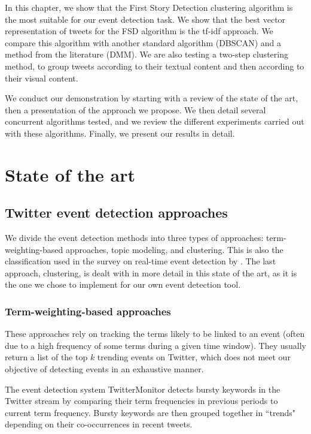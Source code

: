  In this chapter, we show that the First Story Detection clustering algorithm is the most suitable for our event detection task. We show that the best vector representation of tweets for the FSD algorithm is the tf-idf approach. We compare this algorithm with another standard algorithm (DBSCAN) and a method from the literature (DMM). We are also testing a two-step clustering method, to group tweets according to their textual content and then according to their visual content.
 
We conduct our demonstration by starting with a review of the state of the art, then a presentation of the  approach we propose. We then detail several concurrent algorithms tested, and we review the different experiments carried out with these algorithms. Finally, we present our results in detail.


\section{State of the art}

		
		\subsection{Twitter event detection approaches}
		We divide the event detection methods into three types of approaches: term-weighting-based approaches, topic modeling, and clustering. This is also the classification used in the survey on real-time event detection by \citet{hasan_survey_2018}. The last approach, clustering, is dealt with in more detail in this state of the art, as it is the one we chose to implement for our own event detection tool.
		
		\subsubsection{Term-weighting-based approaches}
		These approaches rely on tracking the terms likely to be linked to an event (often due to a high frequency of some terms during a given time window). They usually return a list of the top $k$ trending events on Twitter, which does not meet our objective of detecting events in an exhaustive manner.
		
		The event detection system TwitterMonitor \citep{mathioudakis_twittermonitor:_2010} detects bursty keywords in the Twitter stream by comparing their term frequencies in previous periods to current term frequency. Bursty keywords are then grouped together in ``trends" depending on their co-occurrences in recent tweets. 
		
